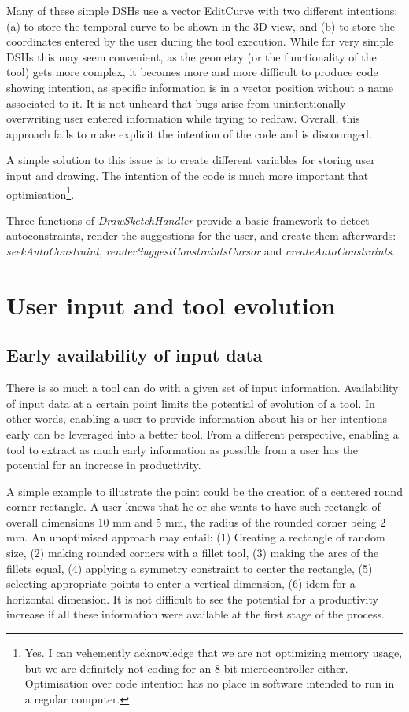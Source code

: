 \documentclass[12pt,twoside,a4paper]{book}
\newcommand{\DrawSketchHandler}{\emph{DrawSketchHandler}}
\begin{document}
    Many of these simple DSHs use a vector EditCurve with two different intentions: (a) to store the temporal curve to be shown in the 3D view, and (b) to store the coordinates entered by the user during the tool execution. While for very simple DSHs this may seem convenient, as the geometry (or the functionality of the tool) gets more complex, it becomes more and more difficult to produce code showing intention, as specific information is in a vector position without a name associated to it. It is not unheard that bugs arise from unintentionally overwriting user entered information while trying to redraw. Overall, this approach fails to make explicit the intention of the code and is discouraged.

    A simple solution to this issue is to create different variables for storing user input and drawing. The intention of the code is much more important that optimisation\footnote{Yes. I can vehemently acknowledge that we are not optimizing memory usage, but we are definitely not coding for an 8 bit microcontroller either. Optimisation over code intention has no place in software intended to run in a regular computer.}.

    Three functions of \DrawSketchHandler{} provide a basic framework to detect autoconstraints, render the suggestions for the user, and create them afterwards: \emph{seekAutoConstraint}, \emph{renderSuggestConstraintsCursor} and \emph{createAutoConstraints}.

    \chapter{User input and tool evolution}

    \section{Early availability of input data}

    There is so much a tool can do with a given set of input information. Availability of input data at a certain point limits the potential of evolution of a tool. In other words, enabling a user to provide information about his or her intentions early can be leveraged into a better tool. From a different perspective, enabling a tool to extract as much early information as possible from a user has the potential for an increase in productivity.

    A simple example to illustrate the point could be the creation of a centered round corner rectangle. A user knows that he or she wants to have such rectangle of overall dimensions 10 mm and 5 mm, the radius of the rounded corner being 2 mm. An unoptimised approach may entail: (1) Creating a rectangle of random size, (2) making rounded corners with a fillet tool, (3) making the arcs of the fillets equal, (4) applying a symmetry constraint to center the rectangle, (5) selecting appropriate points to enter a vertical dimension, (6) idem for a horizontal dimension. It is not difficult to see the potential for a productivity increase if all these information were available at the first stage of the process.
\end{document}
